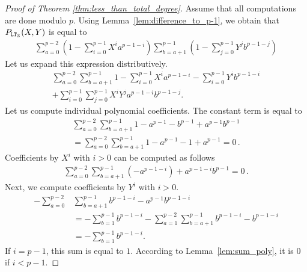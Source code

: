   \begin{proof}[Proof of Theorem \ref{thm:less_than_total_degree}]
    Assume that all computations are done modulo $p$.
    Using Lemma~\ref{lem:difference_to_p-1}, we obtain that $P_{\mathtt{LT}_{\mathcal{S}}}(X,Y)$ is equal to
    \begin{align*}
      \sum_{a = 0}^{p-2} \left(1-\sum_{i=0}^{p-1} X^i a^{p-1-i}\right) \sum_{b=a+1}^{p-1} \left(1-\sum_{j=0}^{p-1} Y^j b^{p-1-j}\right)
    \end{align*}
    Let us expand this expression distributively.
    \begin{align*}
      \sum_{a = 0}^{p-2} \sum_{b=a+1}^{p-1} 1 - \sum_{i=0}^{p-1} X^i a^{p-1-i} - \sum_{i=0}^{p-1} Y^i b^{p-1-i} \\
      + \sum_{i=0}^{p-1} \sum_{j=0}^{p-1} X^i Y^j a^{p-1-i} b^{p-1-j}.
    \end{align*}
    Let us compute individual polynomial coefficients.
    The constant term is equal to
    \begin{align*}
      \sum_{a = 0}^{p-2} \sum_{b=a+1}^{p-1} 1 - a^{p-1} - b^{p-1} + a^{p-1} b^{p-1} \\
      = \sum_{a = 0}^{p-2} \sum_{b=a+1}^{p-1} 1 - a^{p-1} - 1 + a^{p-1} = 0\,. 
    \end{align*}
    Coefficients by $X^i$ with $i > 0$ can be computed as follows
    \begin{align*}
      \sum_{a = 0}^{p-2} \sum_{b=a+1}^{p-1} \left(-a^{p-1-i}\right) + a^{p-1-i}b^{p-1} = 0\,.
    \end{align*}
    Next, we compute coefficients by $Y^i$ with $i > 0$.
    \begin{align*}
      -\sum_{a = 0}^{p-2} &\sum_{b=a+1}^{p-1} b^{p-1-i} - a^{p-1} b^{p-1-i} \\
      &= -\sum_{b=1}^{p-1} b^{p-1-i} - \sum_{a = 1}^{p-2} \sum_{b=a+1}^{p-1} b^{p-1-i} - b^{p-1-i} \\
      &= -\sum_{b=1}^{p-1} b^{p-1-i}.
    \end{align*}
    If $i = p-1$, this sum is equal to $1$.
    According to Lemma~\ref{lem:sum_poly}, it is $0$ if $i < p-1$.
    

\end{proof}

